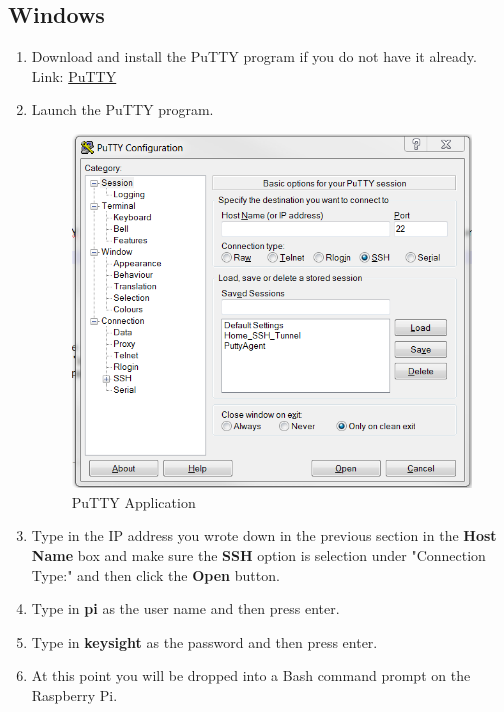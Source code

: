 \documentclass{article}
\begin{document}
	\subsection{Windows}
	
		\begin{enumerate}[1.)]
			\item Download and install the PuTTY program if you do not have it already. Link: \href{https://www.chiark.greenend.org.uk/~sgtatham/putty/latest.html}{PuTTY}
			
			\item Launch the PuTTY program.
				
				\begin{figure}[H]
					\centering
					\includegraphics[width=\textwidth / 2]{pics/PuTTY.png}
					\caption{PuTTY Application}
					\label{Show_IP_app}
				\end{figure}
			
			\item Type in the IP address you wrote down in the previous section in the \textbf{Host Name} box and make sure the \textbf{SSH} option is selection under "Connection Type:" and then click the \textbf{Open} button.
			
			\item Type in \textbf{pi} as the user name and then press enter.
			
			\item Type in \textbf{keysight} as the password and then press enter.
			
			\item At this point you will be dropped into a Bash command prompt on the Raspberry Pi.
			
		\end{enumerate}
	
\end{document}
